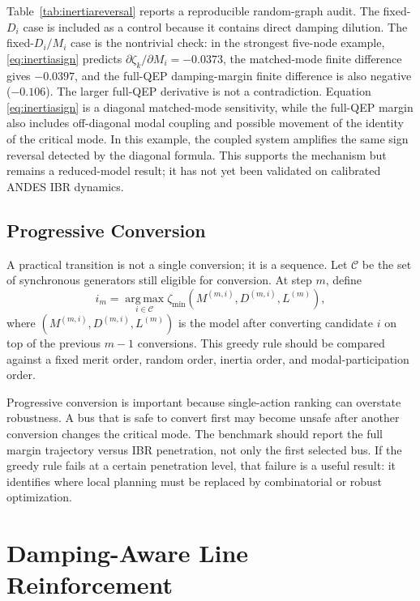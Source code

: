 \documentclass[journal]{IEEEtran}
\newcommand{\argmax}{\operatorname*{arg\,max}}
\begin{document}
Table~\ref{tab:inertiareversal} reports a reproducible random-graph audit. The fixed-$D_i$ case is included as a control because it contains direct damping dilution. The fixed-$D_i/M_i$ case is the nontrivial check: in the strongest five-node example, \eqref{eq:inertiasign} predicts $\partial\zeta_k/\partial M_i=-0.0373$, the matched-mode finite difference gives $-0.0397$, and the full-QEP damping-margin finite difference is also negative ($-0.106$). The larger full-QEP derivative is not a contradiction. Equation \eqref{eq:inertiasign} is a diagonal matched-mode sensitivity, while the full-QEP margin also includes off-diagonal modal coupling and possible movement of the identity of the critical mode. In this example, the coupled system amplifies the same sign reversal detected by the diagonal formula. This supports the mechanism but remains a reduced-model result; it has not yet been validated on calibrated ANDES IBR dynamics.

\subsection{Progressive Conversion}

A practical transition is not a single conversion; it is a sequence. Let $\mathcal{C}$ be the set of synchronous generators still eligible for conversion. At step $m$, define
\begin{equation}
i_m=\argmax_{i\in\mathcal{C}}\zeta_{\min}(M^{(m,i)},D^{(m,i)},L^{(m)}),
\end{equation}
where $(M^{(m,i)},D^{(m,i)},L^{(m)})$ is the model after converting candidate $i$ on top of the previous $m-1$ conversions. This greedy rule should be compared against a fixed merit order, random order, inertia order, and modal-participation order.

Progressive conversion is important because single-action ranking can overstate robustness. A bus that is safe to convert first may become unsafe after another conversion changes the critical mode. The benchmark should report the full margin trajectory versus IBR penetration, not only the first selected bus. If the greedy rule fails at a certain penetration level, that failure is a useful result: it identifies where local planning must be replaced by combinatorial or robust optimization.

\section{Damping-Aware Line Reinforcement}
\end{document}
